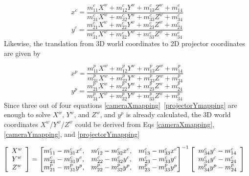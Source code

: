 \begin{equation}
%
x^c %
= \frac%
{m^c_{11}X^w + m^c_{12}Y^w + m^c_{13}Z^w + m^c_{14}}%
{m^c_{31}X^w + m^c_{32}Y^w + m^c_{33}Z^w + m^c_{34}}
%
\label{cameraXmapping}
\end{equation}%
%
%
\begin{equation}
%
y^c %
= \frac%
{m^c_{21}X^w + m^c_{22}Y^w + m^c_{23}Z^w + m^c_{24}}%
{m^c_{31}X^w + m^c_{32}Y^w + m^c_{33}Z^w + m^c_{34}}
%
\label{cameraYmapping}
\end{equation}%
%
%
Likewise, the translation from 3D world coordinates to 2D projector coordinates are given by\par
\begin{equation}
%
x^p %
= \frac%
{m^p_{11}X^w + m^p_{12}Y^w + m^p_{13}Z^w + m^p_{14}}%
{m^p_{31}X^w + m^p_{32}Y^w + m^p_{33}Z^w + m^p_{34}}
%
\label{projectorXmapping}
\end{equation}%
%
\begin{equation}
%
y^p %
= \frac%
{m^p_{21}X^w + m^p_{22}Y^w + m^p_{23}Z^w + m^p_{24}}%
{m^p_{31}X^w + m^p_{32}Y^w + m^p_{33}Z^w + m^p_{34}}
%
\label{projectorYmapping}
\end{equation}%
%
%
Since three out of four equations \ref{cameraXmapping} \texttildelow \,\ref{projectorYmapping} are enough to solve \(X^{w}\),  \(Y^{w}\),  and \(Z^{w}\), and \(y^p\) is already calculated, the 3D world coordinates \(X^{w}\)/\(Y^{w}\)/\(Z^{w}\)  could be derived from Eqs  \ref{cameraXmapping},  \ref{cameraYmapping}, and \ref{projectorYmapping}\par%
%
\begin{equation}
\hspace*{-0.3cm} 
%
\left[ \begin{array}{c} X^w\\ Y^w\\ Z^w\end{array} \right] %
= %
\begin{bmatrix} %
m^c_{11} - m^c_{31}x^c, &m^c_{12} - m^c_{32}x^c, &m^c_{13} - m^c_{33}x^c \\%
m^c_{21} - m^c_{31}y^c, &m^c_{22} - m^c_{32}y^c, &m^c_{23} - m^c_{33}y^c \\%
m^p_{21} - m^p_{31}y^p, &m^p_{22} - m^p_{32}y^p, &m^p_{23} - m^p_{33}y^p %
\end{bmatrix} ^{-1} %
\left[ \begin{array}{c}%
m^c_{34}y^c - m^c_{14}\\%
m^c_{34}y^c - m^c_{24}\\%
m^p_{34}y^p - m^p_{24}%
\end{array} \right]
%
\end{equation}%
\\\\%
%
